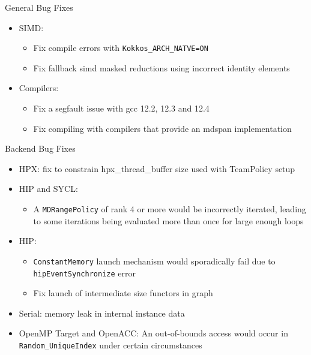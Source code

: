 
\begin{frame}[fragile]{General Bug Fixes}
  \begin{itemize}
    \item SIMD:
    \begin{itemize}
      \item Fix compile errors with \texttt{Kokkos\_ARCH\_NATVE=ON} %
      \item Fix fallback simd masked reductions using incorrect identity elements %
    \end{itemize}
    \item Compilers:
    \begin{itemize}
      \item Fix a segfault issue with gcc 12.2, 12.3 and 12.4 %
      \item Fix compiling with compilers that provide an mdspan implementation %
    \end{itemize}
  \end{itemize}
\end{frame}


\begin{frame}[fragile]{Backend Bug Fixes}
    \begin{itemize}
        \item HPX: fix to constrain hpx\_thread\_buffer size used with TeamPolicy setup %
        \item HIP and SYCL:
        \begin{itemize}
          \item A \texttt{MDRangePolicy} of rank 4 or more would be incorrectly iterated, leading to some iterations being evaluated more than once for large enough loops %
        \end{itemize}
        \item HIP:
        \begin{itemize}
          \item \texttt{ConstantMemory} launch mechanism would sporadically fail due to \texttt{hipEventSynchronize} error %
          \item Fix launch of intermediate size functors in graph %
        \end{itemize}
        \item Serial: memory leak in internal instance data %
        \item OpenMP Target and OpenACC: An out-of-bounds access would occur in \texttt{Random\_UniqueIndex} under certain circumstances %
    \end{itemize}
\end{frame}



